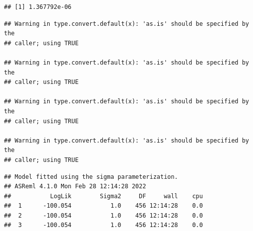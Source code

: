 \documentclass[
  12pt,
]{book}
\newenvironment{Shaded}{\begin{snugshade}}{\end{snugshade}}
\newcommand{\DataTypeTok}[1]{\textcolor[rgb]{0.13,0.29,0.53}{#1}}
\newcommand{\KeywordTok}[1]{\textcolor[rgb]{0.13,0.29,0.53}{\textbf{#1}}}
\newcommand{\NormalTok}[1]{#1}
\newcommand{\OperatorTok}[1]{\textcolor[rgb]{0.81,0.36,0.00}{\textbf{#1}}}
\newcommand{\StringTok}[1]{\textcolor[rgb]{0.31,0.60,0.02}{#1}}
\begin{document}
\begin{verbatim}
## [1] 1.367792e-06
\end{verbatim}

\begin{Shaded}
\end{Shaded}

\begin{verbatim}
## Warning in type.convert.default(x): 'as.is' should be specified by the
## caller; using TRUE

## Warning in type.convert.default(x): 'as.is' should be specified by the
## caller; using TRUE

## Warning in type.convert.default(x): 'as.is' should be specified by the
## caller; using TRUE

## Warning in type.convert.default(x): 'as.is' should be specified by the
## caller; using TRUE
\end{verbatim}

\begin{verbatim}
## Model fitted using the sigma parameterization.
## ASReml 4.1.0 Mon Feb 28 12:14:28 2022
##           LogLik        Sigma2     DF     wall    cpu
##  1      -100.054           1.0    456 12:14:28    0.0
##  2      -100.054           1.0    456 12:14:28    0.0
##  3      -100.054           1.0    456 12:14:28    0.0
\end{verbatim}
\end{document}
